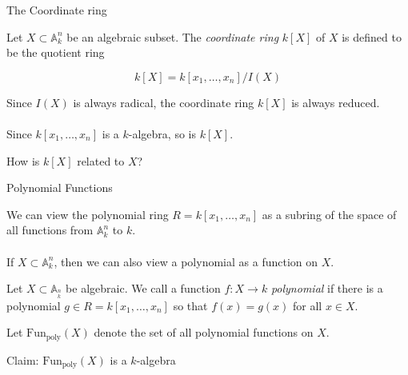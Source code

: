 \documentclass{beamer}
\newcommand{\AAA}{\mathbb{A}}
\begin{document}
\begin{frame}{The Coordinate ring}

\begin{definition}
Let $X\subset \AAA_k^n$ be an algebraic subset.  The \emph{coordinate ring} $k[X]$ of $X$ is defined to be the quotient ring 

$$k[X]=k[x_1,\dots, x_n]/I(X)$$
\end{definition}

Since $I(X)$ is always radical, the coordinate ring $k[X]$ is always reduced. \\~\\

Since $k[x_1,\dots, x_n]$ is a $k$-algebra, so is $k[X]$. 
\begin{block}{How is $k[X]$ related to $X$?}
\end{block}

\end{frame}

\begin{frame}{Polynomial Functions}

We can view the polynomial ring $R=k[x_1,\dots, x_n]$ as a subring of the space of all functions from $\AAA_k^n$ to $k$.  \\~\\

If $X\subset \AAA_k^n$, then we can also view a polynomial as a function on $X$.


\begin{definition}
Let $X\subset \AAA__k^n$ be algebraic.  We call a function $f:X\to k$ \emph{polynomial} if there is a polynomial $g\in R=k[x_1,\dots, x_n]$ so that $f(x)=g(x)$ for all $x\in X$. 
\end{definition}

Let $\text{Fun}_{\text{poly}}(X)$ denote the set of all polynomial functions on $X$.   

\begin{block}{Claim:}
$\text{Fun}_{\text{poly}}(X)$ is a $k$-algebra
\end{block}

\end{frame}
\end{document}
